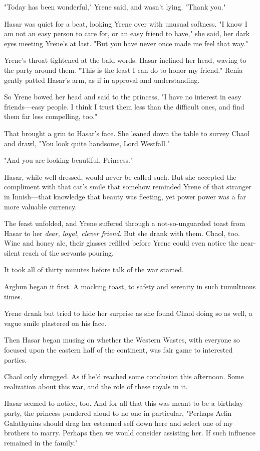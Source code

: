 "Today has been wonderful," Yrene said, and wasn't lying.
"Thank you."

Hasar was quiet for a beat, looking Yrene over with unusual softness.
"I know I am not an easy person to care for, or an easy friend to have," she said, her dark eyes meeting Yrene's at last.
"But you have never once made me feel that way."

Yrene's throat tightened at the bald words.
Hasar inclined her head, waving to the party around them.
"This is the least I can do to honor my friend."
Renia gently patted Hasar's arm, as if in approval and understanding.

So Yrene bowed her head and said to the princess, "I have no interest in easy friends---easy people.
I think I trust them less than the difficult ones, and find them far less compelling, too."

That brought a grin to Hasar's face.
She leaned down the table to survey Chaol and drawl, "You look quite handsome, Lord Westfall."

"And you are looking beautiful, Princess."

Hasar, while well dressed, would never be called such.
But she accepted the compliment with that cat's smile that somehow reminded Yrene of that stranger in Innish---that knowledge that beauty was fleeting, yet power  power was a far more valuable currency.

The feast unfolded, and Yrene suffered through a not-so-unguarded toast from Hasar to her \emph{dear, loyal, clever friend}.
But she drank with them.
Chaol, too.
Wine and honey ale, their glasses refilled before Yrene could even notice the near-silent reach of the servants pouring.

It took all of thirty minutes before talk of the war started.

Arghun began it first.
A mocking toast, to safety and serenity in such tumultuous times.

Yrene drank but tried to hide her surprise as she found Chaol doing so as well, a vague smile plastered on his face.

Then Hasar began musing on whether the Western Wastes, with everyone so focused upon the eastern half of the continent, was fair game to interested parties.

Chaol only shrugged.
As if he'd reached some conclusion this afternoon.
Some realization about this war, and the role of these royals in it.

Hasar seemed to notice, too.
And for all that this was meant to be a birthday party, the princess pondered aloud to no one in particular, "Perhaps Aelin Galathynius should drag her esteemed self down here and select one of my brothers to marry.
Perhaps then we would consider assisting her.
If such influence remained in the family."

